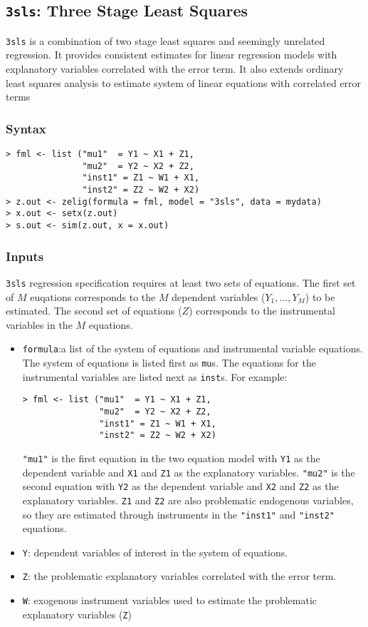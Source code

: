\subsection{\texttt{3sls}: Three Stage Least Squares}
\label{3sls}
\texttt{3sls} is a combination of two stage least squares
and seemingly unrelated regression. It provides consistent estimates for linear regression models with 
explanatory variables correlated with the error term. It also extends ordinary least squares 
analysis to estimate system of linear equations with correlated error terms
\subsubsection{Syntax}
\begin{verbatim}
> fml <- list ("mu1"  = Y1 ~ X1 + Z1,
               "mu2"  = Y2 ~ X2 + Z2,
               "inst1" = Z1 ~ W1 + X1,
               "inst2" = Z2 ~ W2 + X2)
> z.out <- zelig(formula = fml, model = "3sls", data = mydata)
> x.out <- setx(z.out)
> s.out <- sim(z.out, x = x.out)
\end{verbatim}
\subsubsection{Inputs}
\texttt{3sls} regression specification requires at least two sets of equations. The first set of $M$ euqations
corresponds to the $M$ dependent variables ($Y_1,\ldots,Y_M$) to be estimated. The second set of equations ($Z$)
corresponds to the instrumental variables in the $M$ equations.
\begin{itemize}
\item \texttt{formula}:a list of the system of equations and instrumental variable 
equations. The system of equations is listed first as \texttt{mu}s. The equations
for the instrumental variables are listed next as \texttt{inst}s.
For example:
\begin{verbatim}
> fml <- list ("mu1"  = Y1 ~ X1 + Z1,
               "mu2"  = Y2 ~ X2 + Z2,
               "inst1" = Z1 ~ W1 + X1,
               "inst2" = Z2 ~ W2 + X2)
\end{verbatim}
\texttt{"mu1"} is the first equation in the two equation model with \texttt{Y1}
as the dependent variable and \texttt{X1} and \texttt{Z1} as
the explanatory variables. \texttt{"mu2"} is the second equation with 
\texttt{Y2} as the dependent variable
and \texttt{X2} and \texttt{Z2} as the explanatory variables. 
\texttt{Z1} and \texttt{Z2} are also problematic endogenous variables, so
they are estimated through instruments in the \texttt{"inst1"} 
and \texttt{"inst2"} equations.
\item \texttt{Y}: dependent variables of interest in the system of equations.
\item \texttt{Z}: the problematic explanatory variables correlated with 
the error term.
\item \texttt{W}: exogenous instrument variables used to estimate the 
problematic explanatory variables (\texttt{Z})
\end{itemize}
